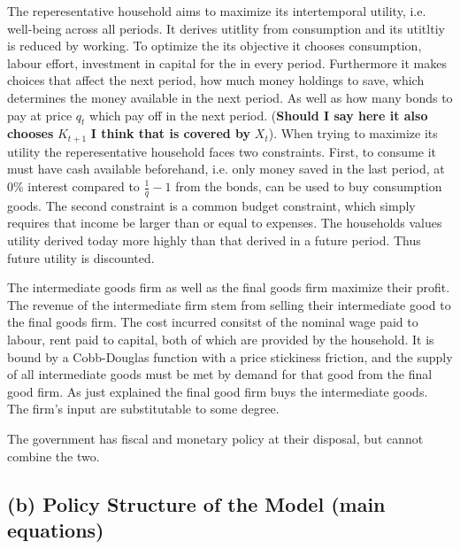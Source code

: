 \documentclass[12pt]{article}
\begin{document}
The reperesentative household aims to maximize its intertemporal utility, i.e. well-being 
across all periods. It derives utitlity from consumption and its utitltiy is reduced by working. To optimize the its objective
it chooses consumption, labour effort, investment in capital for the in every period. %
Furthermore it makes choices that affect the next period,  how much money holdings to save, which determines the money available
in the next period. As well as how many bonds to pay at price $q_t$ which pay off in the next period. (\textbf{Should 
I say here it also chooses} $K_{t+1}$ \textbf{I think that is covered by } $X_t$). When trying to maximize its utility
the reperesentative household faces two constraints. First, to consume it must have cash available beforehand, i.e. only money 
saved in the last period, at 0\% interest compared to $\frac{1}{q} -1$ from the bonds, can be used to buy consumption goods. 
The second constraint is a common budget constraint, which simply requires that income be larger than or equal to expenses. 
The households values utility derived today more highly than that derived in a future period. Thus future utility is discounted. 

The intermediate goods firm as well as the final goods firm maximize their profit. 
The revenue of the intermediate firm stem from selling their intermediate good to the 
final goods firm. The cost incurred consitst of the nominal wage paid to labour, rent paid to capital, both
of which are provided by the household. It is bound by a Cobb-Douglas function with a price stickiness friction, and 
the supply of all intermediate goods must be met by demand for that good from the final good firm. 
As just explained the final good firm buys the intermediate goods. The firm's input are substitutable to some degree. 

The government has fiscal and monetary policy at their disposal, but cannot combine the two. 



\subsection*{(b) Policy Structure of the Model (main equations)}
\end{document}
